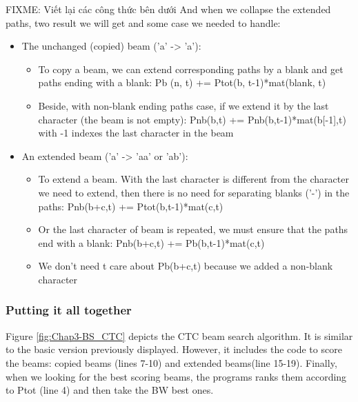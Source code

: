       FIXME: Viết lại các công thức bên dưới
      And when we collapse the extended paths, two result we will get and some case we needed to handle:
        \begin{itemize}
          \item The unchanged (copied) beam ('a' -> 'a'):
          \begin{itemize}
            \item To copy a beam, we can extend corresponding paths by a blank and get
            paths ending with a blank: Pb (n, t) += Ptot(b, t-1)*mat(blank, t)
            \item Beside, with non-blank ending paths case, if we extend it by the last
            character (the beam is not empty): Pnb(b,t) += Pnb(b,t-1)*mat(b[-1],t)
            with -1 indexes the last character in the beam
          \end{itemize}
          \item An extended beam ('a' -> 'aa' or 'ab'):
            \begin{itemize}
              \item To extend a beam. With the last character is different from the character we need
              to extend, then there is no need for separating blanks ('-') in the paths:
                Pnb(b+c,t) += Ptot(b,t-1)*mat(c,t)
              \item Or the last character of beam is repeated, we must ensure that the paths
              end with a blank: Pnb(b+c,t) += Pb(b,t-1)*mat(c,t)
              \item We don't need t care about Pb(b+c,t) because we added a non-blank character
            \end{itemize}
        \end{itemize}

      \subsubsection{ Putting it all together }
        Figure \ref{fig:Chap3-BS_CTC} depicts the CTC beam search algorithm. It is similar to the basic version
        previously displayed. However, it includes the code to score the beams: copied beams
        (lines 7-10) and extended beams(line 15-19). Finally, when we looking for the best scoring
        beams, the programs ranks them according to Ptot (line 4) and then take the BW best ones.

